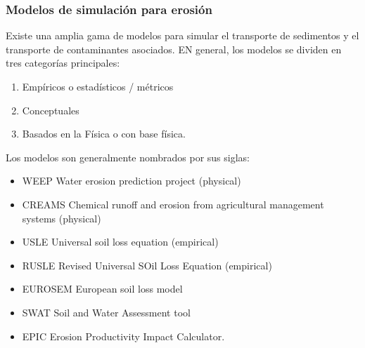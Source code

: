     \subsubsection{Modelos de simulación para erosión}
    Existe una amplia gama de modelos para simular el transporte de sedimentos y el transporte de contaminantes asociados. EN general, los modelos se dividen en tres categorías principales:
    \begin{enumerate}
        \item Empíricos o estadísticos / métricos
        \item Conceptuales
        \item Basados en la Física o con base física.
    \end{enumerate}
    Los modelos son generalmente nombrados por sus siglas:
    \begin{itemize}
        \item WEEP Water erosion prediction project (physical)
        \item CREAMS Chemical runoff and erosion from agricultural management systems (physical)
        \item USLE Universal soil loss equation (empirical)
        \item RUSLE Revised Universal SOil Loss Equation (empirical)
        \item EUROSEM European soil loss model
        \item SWAT Soil and Water Assessment tool
        \item EPIC Erosion Productivity Impact Calculator.
    \end{itemize}
